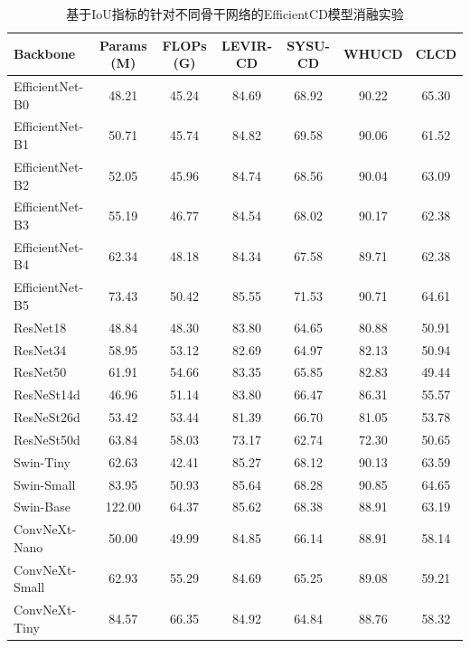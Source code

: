 \begin{table}[!htbp]
  \centering
  \setlength{\tabcolsep}{3pt}
  \caption{基于IoU指标的针对不同骨干网络的EfficientCD模型消融实验}
  \label{tab:efficientcd_backbone}
  \begin{tabular}{lcccccc}
    \toprule
    Backbone         & Params (M) & FLOPs (G) & LEVIR-CD & SYSU-CD & WHUCD & CLCD   \\
    \midrule
    EfficientNet-B0  &   48.21    &   45.24   &  84.69   &  68.92  & 90.22 & 65.30  \\
    EfficientNet-B1  &   50.71    &   45.74   &  84.82   &  69.58  & 90.06 & 61.52  \\
    EfficientNet-B2  &   52.05    &   45.96   &  84.74   &  68.56  & 90.04 & 63.09  \\
    EfficientNet-B3  &   55.19    &   46.77   &  84.54   &  68.02  & 90.17 & 62.38  \\
    EfficientNet-B4  &   62.34    &   48.18   &  84.34   &  67.58  & 89.71 & 62.38  \\
    EfficientNet-B5  &   73.43    &   50.42   &  85.55   &  71.53  & 90.71 & 64.61  \\
    ResNet18         &   48.84    &   48.30   &  83.80   &  64.65  & 80.88 & 50.91  \\
    ResNet34         &   58.95    &   53.12   &  82.69   &  64.97  & 82.13 & 50.94  \\
    ResNet50         &   61.91    &   54.66   &  83.35   &  65.85  & 82.83 & 49.44  \\
    ResNeSt14d       &   46.96    &   51.14   &  83.80   &  66.47  & 86.31 & 55.57  \\
    ResNeSt26d       &   53.42    &   53.44   &  81.39   &  66.70  & 81.05 & 53.78  \\
    ResNeSt50d       &   63.84    &   58.03   &  73.17   &  62.74  & 72.30 & 50.65  \\
    Swin-Tiny        &   62.63    &   42.41   &  85.27   &  68.12  & 90.13 & 63.59  \\
    Swin-Small       &   83.95    &   50.93   &  85.64   &  68.28  & 90.85 & 64.65  \\
    Swin-Base        &  122.00    &   64.37   &  85.62   &  68.38  & 88.91 & 63.19  \\
    ConvNeXt-Nano    &   50.00    &   49.99   &  84.85   &  66.14  & 88.91 & 58.14  \\
    ConvNeXt-Small   &   62.93    &   55.29   &  84.69   &  65.25  & 89.08 & 59.21  \\
    ConvNeXt-Tiny    &   84.57    &   66.35   &  84.92   &  64.84  & 88.76 & 58.32  \\
    \bottomrule
  \end{tabular}
\end{table}



